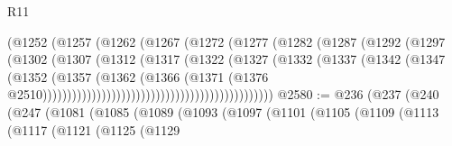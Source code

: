 \begin{lexlean}{R11}
\begin{coremodule}
                                              (@1252
                                                (@1257
                                                  (@1262
                                                    (@1267
                                                      (@1272
                                                        (@1277
                                                          (@1282
                                                            (@1287
                                                              (@1292
                                                                (@1297
                                                                  (@1302
                                                                    (@1307
                                                                      (@1312
                                                                        (@1317
                                                                          (@1322
                                                                            (@1327
                                                                              (@1332
                                                                                (@1337
                                                                                  (@1342
                                                                                    (@1347
                                                                                      (@1352
                                                                                        (@1357
                                                                                          (@1362
                                                                                            (@1366
                                                                                              (@1371
                                                                                                (@1376
                                                                                                  @2510)))))))))))))))))))))))))))))))))))))))))))))))
@2580 := @236
    (@237
      (@240
        (@247
          (@1081
            (@1085
              (@1089
                (@1093
                  (@1097
                    (@1101
                      (@1105
                        (@1109
                          (@1113
                            (@1117
                              (@1121
                                (@1125
                                  (@1129

\end{coremodule}
\end{lexlean}
